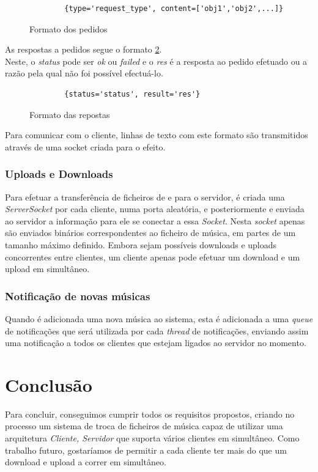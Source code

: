 \documentclass[a4paper]{report}
\begin{document}
\begin{figure}[H]
    \begin{verbatim}
        {type='request_type', content=['obj1','obj2',...]}
    \end{verbatim}
    \caption{Formato dos pedidos}
    \label{inputformat}
\end{figure}
As respostas a pedidos segue o formato \ref{outputformat}.\\
Neste, o \textit{status} pode ser \textit{ok} ou \textit{failed} e o
\textit{res} é a resposta ao pedido efetuado ou a razão pela qual não foi
possível  efectuá-lo.

\begin{figure}[H]
    \begin{verbatim}
        {status='status', result='res'}
    \end{verbatim}
    \caption{Formato das repostas}
    \label{outputformat}
\end{figure}
Para comunicar com o cliente, linhas de texto com este formato são transmitidos
através de uma socket criada para o efeito.

\subsection{Uploads e Downloads}
Para efetuar a transferência de ficheiros de e para o servidor, é criada uma
\textit{ServerSocket} por cada cliente, numa porta aleatória, e posteriormente
e enviada ao servidor a informação para ele se conectar a essa \textit{Socket}.
Nesta \textit{socket} apenas são enviados binários correspondentes ao ficheiro
de música, em partes de um tamanho máximo definido. Embora sejam possíveis
downloads e uploads concorrentes entre clientes, um cliente apenas pode efetuar
um download e um upload em simultâneo.

\subsection{Notificação de novas músicas}
Quando é adicionada uma nova música ao sistema, esta é adicionada a uma
\textit{queue} de notificações que será utilizada por cada \textit{thread} de
notificações, enviando assim uma notificação a todos os clientes que estejam
ligados ao servidor no momento.

\chapter{Conclusão}
Para concluir, conseguimos cumprir todos os requisitos propostos, criando no processo um
sistema de troca de ficheiros de música capaz de utilizar uma arquitetura 
\textit{Cliente, Servidor} que suporta vários clientes em simultâneo.
Como trabalho futuro, gostaríamos de permitir a cada cliente ter mais do que um
download e upload a correr em simultâneo.
\end{document}
